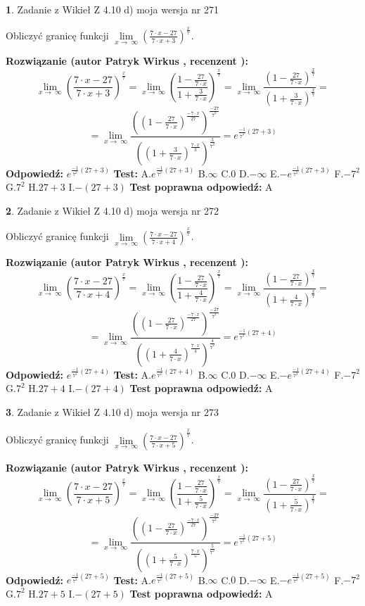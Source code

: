 \documentclass[12pt, a4paper]{article}
\theoremstyle{definition} %
\newtheorem{zad}{}
\newcommand{\zadStart}[1]{\begin{zad}#1\newline}
\newcommand{\zadStop}{\end{zad}}
\newcommand{\rozwStart}[2]{\noindent \textbf{Rozwiązanie (autor #1 , recenzent #2): }\newline}
\newcommand{\rozwStop}{\newline}
\newcommand{\odpStart}{\noindent \textbf{Odpowiedź:}\newline}
\newcommand{\odpStop}{\newline}
\newcommand{\testStart}{\noindent \textbf{Test:}\newline}
\newcommand{\testStop}{\newline}
\newcommand{\kluczStart}{\noindent \textbf{Test poprawna odpowiedź:}\newline}
\newcommand{\kluczStop}{\newline}
\begin{document}
\zadStart{Zadanie z Wikieł Z 4.10 d) moja wersja nr 271}


Obliczyć granicę funkcji  $\lim\limits_{x\to\ \infty}(\frac{7\cdot x-27}{7\cdot x+3})^{\frac{x}{7}}$.
\zadStop
\rozwStart{Patryk Wirkus}{}
$$\lim\limits_{x\to\ \infty}(\frac{7\cdot x-27}{7\cdot x+3})^{\frac{x}{7}} = \lim\limits_{x\to\ \infty}(\frac{1-\frac{27}{7\cdot x}}{1+\frac{3}{7\cdot x}})^{\frac{x}{7}}=\lim\limits_{x\to\ \infty}\frac{(1-\frac{27}{7\cdot x})^{\frac{x}{7}}}{(1+\frac{3}{7\cdot x})^{\frac{x}{7}}}=$$
$$=\lim\limits_{x\to\ \infty}\frac{((1-\frac{27}{7\cdot x})^{\frac{-7\cdot x}{27}})^{\frac{-27}{7^{2}}}}{((1+\frac{3}{7\cdot x})^{\frac{7\cdot x}{3}})^{\frac{3}{7^{2}}}}=e^{\frac{-1}{7^{2}}(27+3)}$$
\rozwStop
\odpStart
$e^{\frac{-1}{7^{2}}(27+3)}$
\odpStop
\testStart
A.$e^{\frac{-1}{7^{2}}(27+3)}$ B.$\infty$ C.$0$ D.$-\infty$ E.$-e^{\frac{-1}{7^{2}}(27+3)}$
F.$-7^{2}$ G.$7^{2}$
H.$27+3$
I.$-(27+3)$
\testStop
\kluczStart
A
\kluczStop



\zadStart{Zadanie z Wikieł Z 4.10 d) moja wersja nr 272}


Obliczyć granicę funkcji  $\lim\limits_{x\to\ \infty}(\frac{7\cdot x-27}{7\cdot x+4})^{\frac{x}{7}}$.
\zadStop
\rozwStart{Patryk Wirkus}{}
$$\lim\limits_{x\to\ \infty}(\frac{7\cdot x-27}{7\cdot x+4})^{\frac{x}{7}} = \lim\limits_{x\to\ \infty}(\frac{1-\frac{27}{7\cdot x}}{1+\frac{4}{7\cdot x}})^{\frac{x}{7}}=\lim\limits_{x\to\ \infty}\frac{(1-\frac{27}{7\cdot x})^{\frac{x}{7}}}{(1+\frac{4}{7\cdot x})^{\frac{x}{7}}}=$$
$$=\lim\limits_{x\to\ \infty}\frac{((1-\frac{27}{7\cdot x})^{\frac{-7\cdot x}{27}})^{\frac{-27}{7^{2}}}}{((1+\frac{4}{7\cdot x})^{\frac{7\cdot x}{4}})^{\frac{4}{7^{2}}}}=e^{\frac{-1}{7^{2}}(27+4)}$$
\rozwStop
\odpStart
$e^{\frac{-1}{7^{2}}(27+4)}$
\odpStop
\testStart
A.$e^{\frac{-1}{7^{2}}(27+4)}$ B.$\infty$ C.$0$ D.$-\infty$ E.$-e^{\frac{-1}{7^{2}}(27+4)}$
F.$-7^{2}$ G.$7^{2}$
H.$27+4$
I.$-(27+4)$
\testStop
\kluczStart
A
\kluczStop



\zadStart{Zadanie z Wikieł Z 4.10 d) moja wersja nr 273}


Obliczyć granicę funkcji  $\lim\limits_{x\to\ \infty}(\frac{7\cdot x-27}{7\cdot x+5})^{\frac{x}{7}}$.
\zadStop
\rozwStart{Patryk Wirkus}{}
$$\lim\limits_{x\to\ \infty}(\frac{7\cdot x-27}{7\cdot x+5})^{\frac{x}{7}} = \lim\limits_{x\to\ \infty}(\frac{1-\frac{27}{7\cdot x}}{1+\frac{5}{7\cdot x}})^{\frac{x}{7}}=\lim\limits_{x\to\ \infty}\frac{(1-\frac{27}{7\cdot x})^{\frac{x}{7}}}{(1+\frac{5}{7\cdot x})^{\frac{x}{7}}}=$$
$$=\lim\limits_{x\to\ \infty}\frac{((1-\frac{27}{7\cdot x})^{\frac{-7\cdot x}{27}})^{\frac{-27}{7^{2}}}}{((1+\frac{5}{7\cdot x})^{\frac{7\cdot x}{5}})^{\frac{5}{7^{2}}}}=e^{\frac{-1}{7^{2}}(27+5)}$$
\rozwStop
\odpStart
$e^{\frac{-1}{7^{2}}(27+5)}$
\odpStop
\testStart
A.$e^{\frac{-1}{7^{2}}(27+5)}$ B.$\infty$ C.$0$ D.$-\infty$ E.$-e^{\frac{-1}{7^{2}}(27+5)}$
F.$-7^{2}$ G.$7^{2}$
H.$27+5$
I.$-(27+5)$
\testStop
\kluczStart
A
\kluczStop
\end{document}
